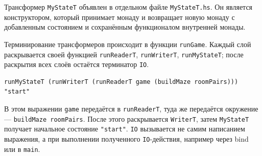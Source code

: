 Трансформер \texttt{MyStateT} объявлен в отдельном файле \texttt{MyStateT.hs}. Он является конструктором, который принимает монаду и возвращает новую монаду с добавленным состоянием и сохранённым функционалом внутренней монады.

Терминирование трансформеров происходит в функции \texttt{runGame}. Каждый слой раскрывается своей функцией \texttt{runReaderT}, \texttt{runWriterT}, \texttt{runMyStateT}; после раскрытия всех слоёв остаётся терминатор \texttt{IO}.

\label{lst:run-game-pr4}
\begin{verbatim}
runMyStateT (runWriterT (runReaderT game (buildMaze roomPairs))) "start"
\end{verbatim}

В этом выражении \texttt{game} передаётся в \texttt{runReaderT}, туда же передаётся окружение --- \texttt{buildMaze roomPairs}. После этого раскрывается \texttt{WriterT}, затем \texttt{MyStateT} получает начальное состояние \texttt{"start"}. \texttt{IO} вызывается не самим написанием выражения, а при выполнении полученного \texttt{IO}-действия, например через bind или в \texttt{main}.

\newpage
